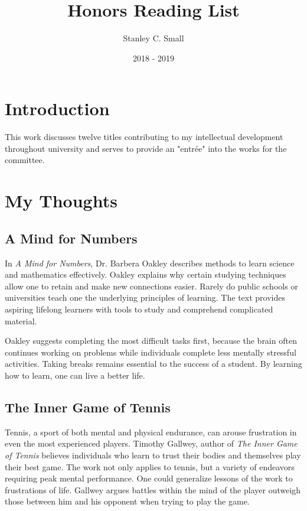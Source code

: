 \documentclass{article}
\title{Honors Reading List}
\author{Stanley C. Small}
\date{2018 - 2019}
\begin{document}
\begin{titlepage}
\maketitle
\tableofcontents
\thispagestyle{empty}
\end{titlepage}

\newpage
\section{Introduction}
This work discusses twelve titles contributing to my intellectual development throughout university and serves to provide an "entr\'{e}e" into the works for the committee. 

\section{My Thoughts}

\subsection{A Mind for Numbers}
In \textit{A Mind for Numbers}, Dr. Barbera Oakley describes methods to learn science and mathematics effectively. Oakley explains why certain studying techniques allow one to retain and make new connections easier. Rarely do public schools or universities teach one the underlying principles of learning. The text provides aspiring lifelong learners with tools to study and comprehend complicated material.  

Oakley suggests completing the most difficult tasks first, because the brain often continues working on problems while individuals complete less mentally stressful activities. Taking breaks remains essential to the success of a student. By learning how to learn, one can live a better life. 

\subsection{The Inner Game of Tennis}
Tennis, a sport of both mental and physical endurance, can arouse frustration in even the most experienced players. Timothy Gallwey, author of \textit{The Inner Game of Tennis} believes individuals who learn to trust their bodies and themselves play their best game. The work not only applies to tennis, but a variety of endeavors requiring peak mental performance. One could generalize lessons of the work to frustrations of life. Gallwey argues battles within the mind of the player outweigh those between him and his opponent when trying to play the game. 
\end{document}
